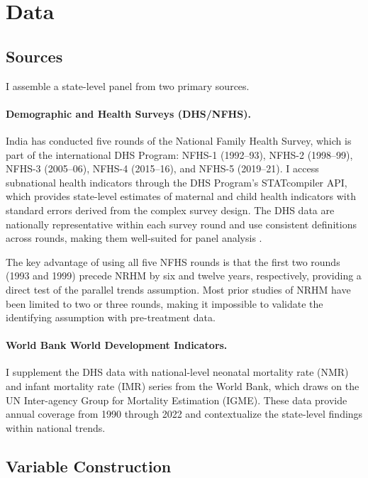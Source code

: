 \documentclass[12pt]{article}
\begin{document}
\section{Data}
\label{sec:data}

\subsection{Sources}

I assemble a state-level panel from two primary sources.

\paragraph{Demographic and Health Surveys (DHS/NFHS).} India has conducted five rounds of the National Family Health Survey, which is part of the international DHS Program: NFHS-1 (1992--93), NFHS-2 (1998--99), NFHS-3 (2005--06), NFHS-4 (2015--16), and NFHS-5 (2019--21). I access subnational health indicators through the DHS Program's STATcompiler API, which provides state-level estimates of maternal and child health indicators with standard errors derived from the complex survey design. The DHS data are nationally representative within each survey round and use consistent definitions across rounds, making them well-suited for panel analysis \citep{corsi2012demographic}.

The key advantage of using all five NFHS rounds is that the first two rounds (1993 and 1999) precede NRHM by six and twelve years, respectively, providing a direct test of the parallel trends assumption. Most prior studies of NRHM have been limited to two or three rounds, making it impossible to validate the identifying assumption with pre-treatment data.

\paragraph{World Bank World Development Indicators.} I supplement the DHS data with national-level neonatal mortality rate (NMR) and infant mortality rate (IMR) series from the World Bank, which draws on the UN Inter-agency Group for Mortality Estimation (IGME). These data provide annual coverage from 1990 through 2022 and contextualize the state-level findings within national trends.

\subsection{Variable Construction}
\end{document}
